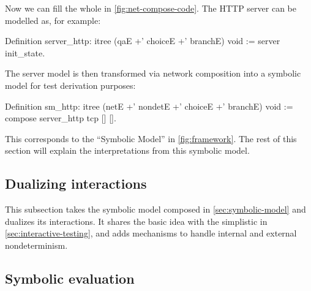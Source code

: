 Now we can fill the whole  in \autoref{fig:net-compose-code}.  The
HTTP server can be modelled as, for example:
\begin{coq}
  Definition server_http: itree (qaE +' choiceE +' branchE) void :=
    server init_state.
\end{coq}

The server model is then transformed via network composition into a symbolic
model for test derivation purposes:
\begin{coq}
  Definition sm_http: itree (netE +' nondetE +' choiceE +' branchE) void :=
    compose server_http tcp [] [].
\end{coq}

This corresponds to the ``Symbolic Model'' in \autoref{fig:framework}.  The rest
of this section will explain the interpretations from this symbolic model.

\subsection{Dualizing interactions}
\label{sec:dualize-interaction}
This subsection takes the symbolic model composed in
\autoref{sec:symbolic-model} and dualizes its interactions.  It shares the basic
idea with the simplistic  in \autoref{sec:interactive-testing}, and
adds mechanisms to handle internal and external nondeterminism.




\subsection{Symbolic evaluation}
\label{sec:symbolic-eval}
